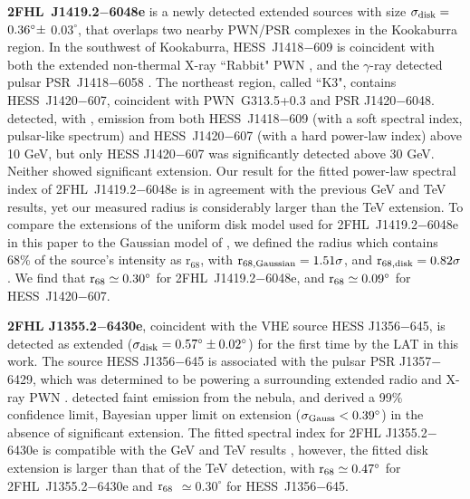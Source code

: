 {\bfseries 2FHL~J1419.2$-$6048e} is a newly detected extended sources with size
 ${\rm \sigma_{disk} =}$ ${\rm 0.36 ^{\circ} \pm}$ $0.03 ^{\circ}$, that overlaps two nearby PWN/PSR complexes in the Kookaburra region. In the southwest of Kookaburra, HESS~J1418$-$609 \citep{AharonianKook06} is coincident with both the extended non-thermal X-ray ``Rabbit" PWN \citep[G313.3+0.1,][]{Roberts99}, and the $\gamma$-ray detected pulsar PSR~J1418$-$6058 \citep{AbdoBlindPSR09}. The northeast region, called ``K3", contains HESS~J1420$-$607, coincident with PWN~G313.5+0.3 and PSR J1420$-$6048. \cite{Acero13} detected, with \lat, emission from both HESS~J1418$-$609 (with a soft spectral index, pulsar-like spectrum) and HESS~J1420$-$607 (with a hard power-law index) above 10 GeV, but only HESS J1420$-$607 was significantly detected above 30 GeV. Neither showed significant extension. Our result for the fitted power-law spectral index of 2FHL~J1419.2$-$6048e is in agreement with the previous GeV and TeV results, yet our measured radius is considerably larger than the TeV extension. To compare the extensions of the uniform disk model used for 2FHL~J1419.2$-$6048e in this paper to the Gaussian model of \cite{AharonianKook06}, we defined the radius which contains 68\% of the source's intensity as r$_{68}$, with ${\rm r_{68,Gaussian} = 1.51\sigma}$, and ${\rm r_{68,disk} = 0.82\sigma}$  \citep{Lande12}. We find that ${\rm r_{68} \simeq 0.30^{\circ}}$ for 2FHL~J1419.2$-$6048e, and ${\rm r_{68}} \simeq 0.09^{\circ}$ for HESS~J1420$-$607. 

{\bfseries 2FHL J1355.2$-$6430e}, coincident with the VHE source HESS J1356$-$645, is detected as extended (${\rm \sigma_{disk} =  0.57^{\circ} \pm 0.02^{\circ}}$) for the first time by the LAT in this work. The  source HESS J1356$-$645 \citep{Abramowski11} is associated with the pulsar PSR J1357$-$6429, which was determined to be powering a surrounding extended radio and X-ray PWN \citep{Lemoine-Goumard11}. \cite{Acero13} detected faint emission from the nebula, and derived a 99\% confidence limit, Bayesian upper limit on extension (${\rm \sigma_{Gauss} < 0.39^{\circ}}$) in the absence of significant extension. The fitted spectral index for 2FHL J1355.2$-$6430e is compatible with the GeV and TeV results \citep{Acero13,Abramowski11}, however, the fitted disk extension is larger than that of the TeV detection, with ${\rm r_{68} \simeq 0.47^{\circ}}$ for 2FHL~J1355.2$-$6430e and ${\rm r_{68}}$ $\simeq 0.30^{\circ}$ for HESS~J1356$-$645.

